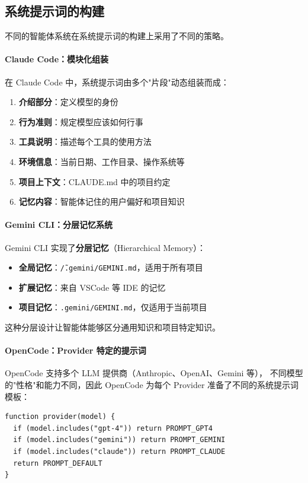 \subsection{系统提示词的构建}

不同的智能体系统在系统提示词的构建上采用了不同的策略。

\paragraph{Claude Code：模块化组装}
在 Claude Code 中，系统提示词由多个"片段"动态组装而成：

\begin{enumerate}
    \item \textbf{介绍部分}：定义模型的身份
    \item \textbf{行为准则}：规定模型应该如何行事
    \item \textbf{工具说明}：描述每个工具的使用方法
    \item \textbf{环境信息}：当前日期、工作目录、操作系统等
    \item \textbf{项目上下文}：CLAUDE.md 中的项目约定
    \item \textbf{记忆内容}：智能体记住的用户偏好和项目知识
\end{enumerate}

\paragraph{Gemini CLI：分层记忆系统}
Gemini CLI 实现了\textbf{分层记忆}（Hierarchical Memory）：

\begin{itemize}
    \item \textbf{全局记忆}：\texttt{\~/.gemini/GEMINI.md}，适用于所有项目
    \item \textbf{扩展记忆}：来自 VSCode 等 IDE 的记忆
    \item \textbf{项目记忆}：\texttt{.gemini/GEMINI.md}，仅适用于当前项目
\end{itemize}

这种分层设计让智能体能够区分通用知识和项目特定知识。

\paragraph{OpenCode：Provider 特定的提示词}
OpenCode 支持多个 LLM 提供商（Anthropic、OpenAI、Gemini 等），
不同模型的"性格"和能力不同，因此 OpenCode 为每个 Provider 准备了不同的系统提示词模板：

\begin{verbatim}
function provider(model) {
  if (model.includes("gpt-4")) return PROMPT_GPT4
  if (model.includes("gemini")) return PROMPT_GEMINI
  if (model.includes("claude")) return PROMPT_CLAUDE
  return PROMPT_DEFAULT
}
\end{verbatim}

